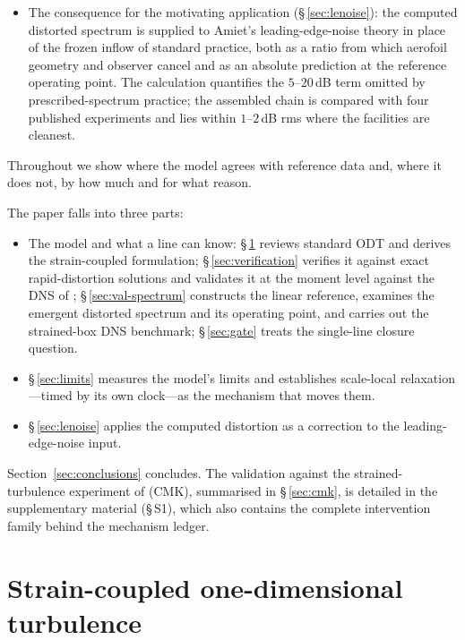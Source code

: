 \documentclass[lineno]{JFM-FLM_Au}
\begin{document}
\begin{itemize}
\item The consequence for the motivating application
(\S\,\ref{sec:lenoise}): the computed distorted spectrum is supplied to
Amiet's leading-edge-noise theory in place of the frozen inflow of standard
practice, both as a ratio from which aerofoil geometry and observer cancel
and as an absolute prediction at the reference operating point. The
calculation quantifies the $5$--$20$\,dB term omitted by prescribed-spectrum
practice; the assembled chain is compared with four published experiments
and lies within $1$--$2$\,dB rms where the facilities are cleanest.
\end{itemize}
Throughout we show where the model agrees with reference data and, where it
does not, by how much and for what reason.


The paper falls into three parts:
\begin{itemize}
\item The model and what a line can know: \S\,\ref{sec:formulation}
reviews standard ODT and derives the strain-coupled formulation;
\S\,\ref{sec:verification} verifies it against exact rapid-distortion
solutions and validates it at the moment level against the DNS of
\citet{LeeReynolds1985}; \S\,\ref{sec:val-spectrum} constructs the linear
reference, examines the emergent distorted spectrum and its operating
point, and carries out the strained-box DNS benchmark; \S\,\ref{sec:gate}
treats the single-line closure question.

\item \S\,\ref{sec:limits} measures the model's limits and establishes
scale-local relaxation---timed by its own clock---as the mechanism that
moves them.

\item \S\,\ref{sec:lenoise} applies the computed distortion as a
correction to the leading-edge-noise input.
\end{itemize}
Section~\ref{sec:conclusions} concludes. The validation against the strained-turbulence experiment of \citet{ChenMeneveauKatz2006} (CMK), summarised in \S\,\ref{sec:cmk}, is detailed in the supplementary material (\S\,S1), which also contains the complete intervention family behind the mechanism ledger.

\section{Strain-coupled one-dimensional turbulence}\label{sec:formulation}
\end{document}
